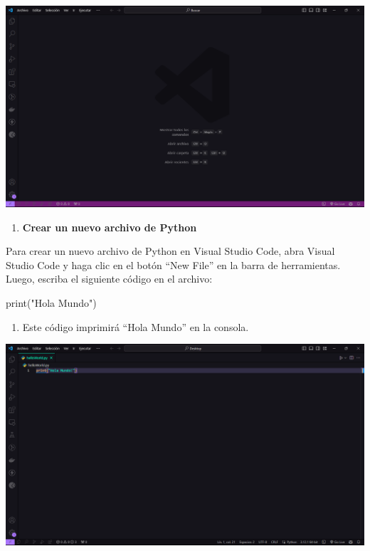 \documentclass[
  a4paper,
  DIV=11,
  numbers=noendperiod,
  onepage,
  openany]{scrreprt}
\newenvironment{Shaded}{\begin{snugshade}}{\end{snugshade}}
\newcommand{\BuiltInTok}[1]{\textcolor[rgb]{0.00,0.23,0.31}{#1}}
\newcommand{\NormalTok}[1]{\textcolor[rgb]{0.00,0.23,0.31}{#1}}
\newcommand{\StringTok}[1]{\textcolor[rgb]{0.13,0.47,0.30}{#1}}
\providecommand{\tightlist}{%
  \setlength{\itemsep}{0pt}\setlength{\parskip}{0pt}}\usepackage{longtable,booktabs,array}
\begin{document}
\includegraphics{unidades/unidad2/images/paste-7.png}

\begin{enumerate}
\def\labelenumi{\arabic{enumi}.}
\setcounter{enumi}{1}
\tightlist
\item
  \textbf{Crear un nuevo archivo de Python}
\end{enumerate}

Para crear un nuevo archivo de Python en Visual Studio Code, abra Visual
Studio Code y haga clic en el botón ``New File'' en la barra de
herramientas. Luego, escriba el siguiente código en el archivo:

\begin{Shaded}
\begin{Highlighting}[]
\BuiltInTok{print}\NormalTok{(}\StringTok{"Hola Mundo"}\NormalTok{)}
\end{Highlighting}
\end{Shaded}

\begin{enumerate}
\def\labelenumi{\arabic{enumi}.}
\setcounter{enumi}{2}
\tightlist
\item
  Este código imprimirá ``Hola Mundo'' en la consola.
\end{enumerate}

\includegraphics{unidades/unidad2/images/paste-8.png}
\end{document}
